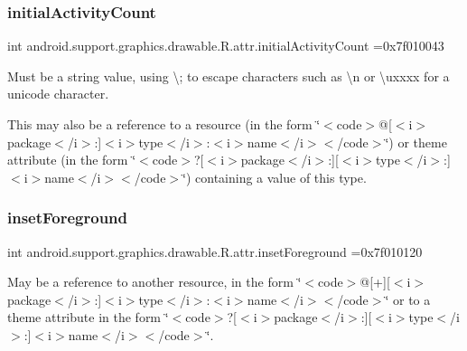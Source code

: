 \subsubsection{\texorpdfstring{initial\+Activity\+Count}{initialActivityCount}}
{\footnotesize\ttfamily int android.\+support.\+graphics.\+drawable.\+R.\+attr.\+initial\+Activity\+Count =0x7f010043\hspace{0.3cm}{\ttfamily [static]}}

Must be a string value, using \textquotesingle{}\textbackslash{};\textquotesingle{} to escape characters such as \textquotesingle{}\textbackslash{}n\textquotesingle{} or \textquotesingle{}\textbackslash{}uxxxx\textquotesingle{} for a unicode character. 

This may also be a reference to a resource (in the form \char`\"{}$<$code$>$@\mbox{[}$<$i$>$package$<$/i$>$\+:\mbox{]}$<$i$>$type$<$/i$>$\+:$<$i$>$name$<$/i$>$$<$/code$>$\char`\"{}) or theme attribute (in the form \char`\"{}$<$code$>$?\mbox{[}$<$i$>$package$<$/i$>$\+:\mbox{]}\mbox{[}$<$i$>$type$<$/i$>$\+:\mbox{]}$<$i$>$name$<$/i$>$$<$/code$>$\char`\"{}) containing a value of this type. \mbox{\label{classandroid_1_1support_1_1graphics_1_1drawable_1_1R_1_1attr_a366c423ad72c9edfc8be24e4cb96c700}} 
\subsubsection{\texorpdfstring{inset\+Foreground}{insetForeground}}
{\footnotesize\ttfamily int android.\+support.\+graphics.\+drawable.\+R.\+attr.\+inset\+Foreground =0x7f010120\hspace{0.3cm}{\ttfamily [static]}}

May be a reference to another resource, in the form \char`\"{}$<$code$>$@\mbox{[}+\mbox{]}\mbox{[}$<$i$>$package$<$/i$>$\+:\mbox{]}$<$i$>$type$<$/i$>$\+:$<$i$>$name$<$/i$>$$<$/code$>$\char`\"{} or to a theme attribute in the form \char`\"{}$<$code$>$?\mbox{[}$<$i$>$package$<$/i$>$\+:\mbox{]}\mbox{[}$<$i$>$type$<$/i$>$\+:\mbox{]}$<$i$>$name$<$/i$>$$<$/code$>$\char`\"{}. 

